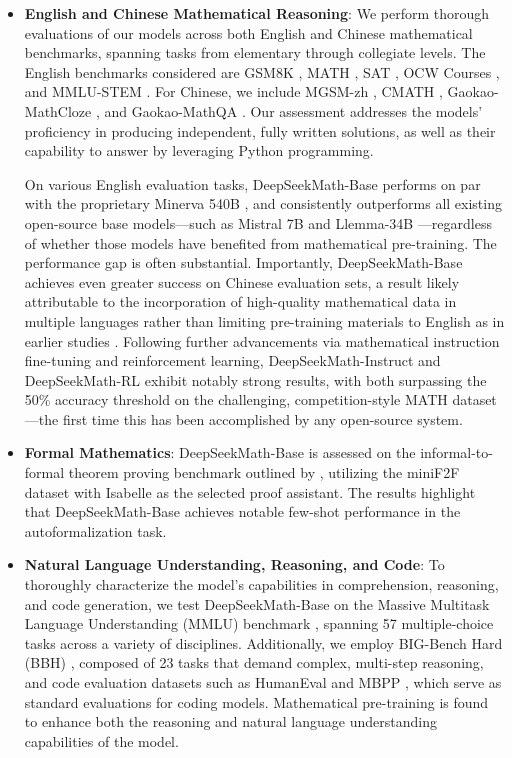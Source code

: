 \begin{itemize}[topsep=0pt]
    \item \textbf{English and Chinese Mathematical Reasoning}: We perform thorough evaluations of our models across both English and Chinese mathematical benchmarks, spanning tasks from elementary through collegiate levels. The English benchmarks considered are GSM8K \citep{gsm8k}, MATH \citep{MATH}, SAT \citep{llemma}, OCW Courses \citep{minerva}, and MMLU-STEM \citep{mmlu}. For Chinese, we include MGSM-zh \citep{mgsm}, CMATH \citep{wei2023cmath}, Gaokao-MathCloze \citep{agieval}, and Gaokao-MathQA \citep{agieval}. Our assessment addresses the models' proficiency in producing independent, fully written solutions, as well as their capability to answer by leveraging Python programming.

On various English evaluation tasks, DeepSeekMath-Base performs on par with the proprietary Minerva 540B \citep{minerva}, and consistently outperforms all existing open-source base models—such as Mistral 7B \citep{mistral} and Llemma-34B \citep{llemma}—regardless of whether those models have benefited from mathematical pre-training. The performance gap is often substantial. Importantly, DeepSeekMath-Base achieves even greater success on Chinese evaluation sets, a result likely attributable to the incorporation of high-quality mathematical data in multiple languages rather than limiting pre-training materials to English as in earlier studies \citep{minerva,llemma}. Following further advancements via mathematical instruction fine-tuning and reinforcement learning, DeepSeekMath-Instruct and DeepSeekMath-RL exhibit notably strong results, with both surpassing the 50\% accuracy threshold on the challenging, competition-style MATH dataset—the first time this has been accomplished by any open-source system.

\item \textbf{Formal Mathematics}: DeepSeekMath-Base is assessed on the informal-to-formal theorem proving benchmark outlined by \citep{dsp_proof}, utilizing the miniF2F dataset \citep{minif2f} with Isabelle \citep{isabelle} as the selected proof assistant. The results highlight that DeepSeekMath-Base achieves notable few-shot performance in the autoformalization task.

\item \textbf{Natural Language Understanding, Reasoning, and Code}: To thoroughly characterize the model’s capabilities in comprehension, reasoning, and code generation, we test DeepSeekMath-Base on the Massive Multitask Language Understanding (MMLU) benchmark \citep{mmlu}, spanning 57 multiple-choice tasks across a variety of disciplines. Additionally, we employ BIG-Bench Hard (BBH) \citep{bbh}, composed of 23 tasks that demand complex, multi-step reasoning, and code evaluation datasets such as HumanEval \citep{codex} and MBPP \citep{mbpp}, which serve as standard evaluations for coding models. Mathematical pre-training is found to enhance both the reasoning and natural language understanding capabilities of the model.


\end{itemize}
